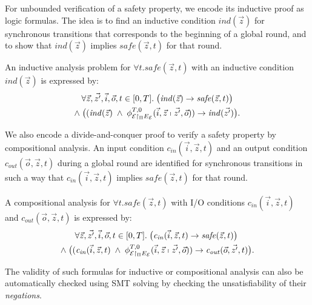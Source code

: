 For unbounded verification of a safety property,
we encode its inductive proof as logic formulas.
The idea is to find an inductive condition $\mathit{ind}(\vec{z})$ 
for synchronous transitions
that corresponds to the beginning of a global round,
and to show that $\mathit{ind}(\vec{z})$ implies %
$\mathit{safe}(\vec{z},t)$ 
for that round.

\begin{definition} 
An inductive analysis problem for $\forall t.  \mathit{safe}(\vec{z},t)$
with an inductive condition $\mathit{ind}(\vec{z})$ is expressed by:
\begin{multline*}
\forall \vec{z}, \vec{z'}, \vec{i}, \vec{o}, t \in [0,T].\;
\big(\mathit{ind}(\vec{z})  \rightarrow \mathit{safe}(\vec{z},t)\big)
\\
\wedge\;
\big(
(\mathit{ind}(\vec{z})\;\wedge\;\phi_{\mathcal{E} \restriction_{\Pi} E_\mathcal{E}}^{T,0}(\vec{i}, \vec{z}\shortmid \vec{z'}, \vec{o}))
\rightarrow
\mathit{ind}(\vec{z'})\big)
.
\end{multline*}
\end{definition}

We also encode a divide-and-conquer proof
to verify a safety property by compositional analysis. %
An input condition $\mathit{c}_\mathit{in}(\vec{i},\vec{z},t)$
and an output condition $\mathit{c}_\mathit{out}(\vec{o},\vec{z},t)$ 
during a global round
are identified for synchronous transitions
in such a way 
that $\mathit{c}_\mathit{in}(\vec{i},\vec{z},t)$ implies %
$\mathit{safe}(\vec{z},t)$ for that round.


\begin{definition} A compositional analysis for $\forall t.  \mathit{safe}(\vec{z},t)$
with I/O conditions $\mathit{c}_\mathit{in}(\vec{i},\vec{z},t)$ and $\mathit{c}_\mathit{out}(\vec{o},\vec{z},t)$
is expressed by:
\begin{multline*}
\forall \vec{z}, \vec{z'}, \vec{i}, \vec{o}, t \in [0,T].\;
\big(\mathit{c}_\mathit{in}(\vec{i},\vec{z},t) \rightarrow \mathit{safe}(\vec{z},t) \big)
\phantom{.}
\\
\wedge\;
\big(
(\mathit{c}_\mathit{in}(\vec{i},\vec{z},t)
\;\wedge\;
\phi_{\mathcal{E} \restriction_{\Pi} E_\mathcal{E}}^{T,0}(
	\vec{i}, \vec{z}
	\shortmid 
	\vec{z'}, \vec{o})
)
\rightarrow
\mathit{c}_\mathit{out}(\vec{o},\vec{z'},t)\big).
\end{multline*}
\end{definition}

The validity of such formulas for inductive or compositional  analysis can also be automatically checked 
using SMT solving
by checking the unsatisfiability of their \emph{negations}.









